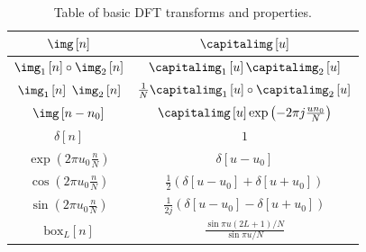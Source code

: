 \begin{table}[t]
	\caption{Table of basic DFT transforms and properties.} %
	\begin{center}
		\begin{tabular}{| c | c |}
			\hline
			\bf $\img \left[ n \right]$                             & \bf $\capitalimg \left[u \right]$                                               \\
			\hline \hline
			$\img_1 \left[ n \right] \circ \img_2 \left[ n \right]$ & $\capitalimg_1 \left[u \right] \capitalimg_2 \left[u \right]$                   \\
			\hline
			$\img_1 \left[ n \right]$ $\img_2 \left[ n \right]$     & $\frac{1}{N} \capitalimg_1 \left[u \right] \circ \capitalimg_2 \left[u \right]$ \\
			\hline
			$\img \left[ n-n_0 \right]$                             & $\capitalimg \left[u \right] \exp{ \left( - 2 \pi j \frac{u n_0}{N} \right) }$  \\
			\hline
			$\delta \left[ n \right]$                               & $1$                                                                             \\
			\hline
			$\exp{ \left( 2 \pi u_0 \frac{n}{N} \right) }$          &
			$\delta \left[u-u_0 \right]$                                                                                                              \\
			\hline
			$\cos{ \left( 2 \pi u_0 \frac{n}{N} \right) }$          &
			$\frac{1}{2} \left( \delta \left[u-u_0 \right] +  \delta \left[u+u_0\right] \right)$                                                      \\
			\hline
			$\sin{ \left( 2 \pi u_0 \frac{n}{N} \right) }$          &
			$\frac{1}{2j} \left( \delta \left[u-u_0 \right] -  \delta \left[u+u_0\right] \right)$                                                     \\
			\hline
			$\text{box}_{L} \left[n \right]$                        & $\frac{\sin \pi u (2L+1)/N}{\sin \pi u/N}$                                      \\
			\hline
		\end{tabular}
	\end{center}
	\label{table:tableDFT}
\end{table}

